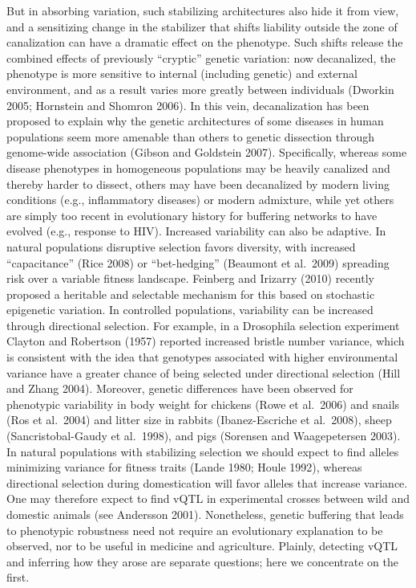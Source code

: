 \documentclass[
]{book}
\begin{document}
But in absorbing variation, such stabilizing architectures also hide it from view, and a sensitizing change in the stabilizer that shifts liability outside the zone of canalization can have a dramatic effect on the phenotype. Such shifts release the combined effects of previously ``cryptic'' genetic variation: now decanalized, the phenotype is more sensitive to internal (including genetic) and external environment, and as a result varies more greatly between individuals (Dworkin 2005; Hornstein and Shomron 2006). In this vein, decanalization has been proposed to explain why the genetic architectures of some diseases in human populations seem more amenable than others to genetic dissection through genome-wide association (Gibson and Goldstein 2007). Specifically, whereas some disease phenotypes in homogeneous populations may be heavily canalized and thereby harder to dissect, others may have been decanalized by modern living conditions (e.g., inflammatory diseases) or modern admixture, while yet others are simply too recent in evolutionary history for buffering networks to have evolved (e.g., response to HIV). Increased variability can also be adaptive. In natural populations disruptive selection favors diversity, with increased ``capacitance'' (Rice 2008) or ``bet-hedging'' (Beaumont et al.~2009) spreading risk over a variable fitness landscape. Feinberg and Irizarry (2010) recently proposed a heritable and selectable mechanism for this based on stochastic epigenetic variation. In controlled populations, variability can be increased through directional selection. For example, in a Drosophila selection experiment Clayton and Robertson (1957) reported increased bristle number variance, which is consistent with the idea that genotypes associated with higher environmental variance have a greater chance of being selected under directional selection (Hill and Zhang 2004). Moreover, genetic differences have been observed for phenotypic variability in body weight for chickens (Rowe et al.~2006) and snails (Ros et al.~2004) and litter size in rabbits (Ibanez-Escriche et al.~2008), sheep (Sancristobal-Gaudy et al.~1998), and pigs (Sorensen and Waagepetersen 2003). In natural populations with stabilizing selection we should expect to find alleles minimizing variance for fitness traits (Lande 1980; Houle 1992), whereas directional selection during domestication will favor alleles that increase variance. One may therefore expect to find vQTL in experimental crosses between wild and domestic animals (see Andersson 2001). Nonetheless, genetic buffering that leads to phenotypic robustness need not require an evolutionary explanation to be observed, nor to be useful in medicine and agriculture. Plainly, detecting vQTL and inferring how they arose are separate questions; here we concentrate on the first.
\end{document}
